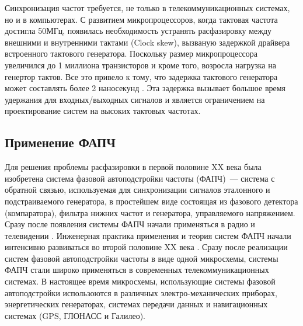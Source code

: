 \documentclass[a4paper,14pt]{article} %
\begin{document}
Синхронизация частот требуется, не только в телекоммуникационных системах, но и в компьютерах. С развитием микропроцессоров, когда тактовая частота достигла 50МГц, появилась необходимость устранять расфазировку между внешними и внутренними тактами (Clock skew), вызваную задержкой драйвера встроенного тактового генератора. Поскольку размер микропроцессора увеличился до 1 миллиона транзисторов и кроме того, возросла нагрузка на генертор тактов. Все это привело к тому, что задержка тактового генератора может составлять более 2 наносекунд \cite{Microprocessors}. Эта задержка вызывает большое время удержания для входных/выходных сигналов и является ограничением на проектирование систем на высоких тактовых частотах.

 \subsection{Применение ФАПЧ}

Для решения проблемы расфазировки в первой половине XX века была изобретена система фазовой автоподстройки частоты \cite{appleton} (ФАПЧ)~--- система с обратной связью, используемая для синхронизации сигналов эталонного и подстраиваемого генератора, в простейшем виде состоящая из фазового детектора (компаратора), фильтра нижних частот и генератора, управляемого напряжением. Сразу после появления системы ФАПЧ начали применяться в радио и телевидении \cite{blagov}. Инженерная практика применения и теория систем ФАПЧ начали интенсивно развиваться во второй половине XX века \cite{seledji}. Сразу после реализации систем фазовой автоподстройки частоты в виде одной микросхемы, системы ФАПЧ стали широко применяться в современных телекоммуникационных системах. В настоящее время микросхемы, использующие системы фазовой автоподстройки использоются в различных электро-механических приборах, энергетических генераторах, системах передачи данных \cite{ashari} и навигационных системах \cite{rao} (GPS, ГЛОНАСС и Галилео).
\end{document}
